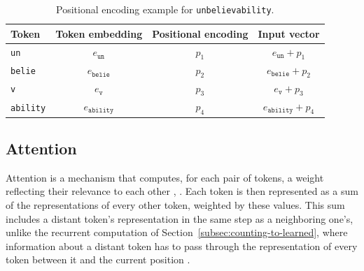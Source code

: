 \begin{table}[H]
  \centering
  \renewcommand{\arraystretch}{1.2}
  \begin{tabular}{@{}lccc@{}}
    \toprule
    Token & Token embedding & Positional encoding & Input vector \\
    \midrule
    \texttt{un}      & $e_{\mathtt{un}}$      & $p_1$ & $e_{\mathtt{un}} + p_1$ \\
    \texttt{belie}   & $e_{\mathtt{belie}}$   & $p_2$ & $e_{\mathtt{belie}} + p_2$ \\
    \texttt{v}       & $e_{\mathtt{v}}$       & $p_3$ & $e_{\mathtt{v}} + p_3$ \\
    \texttt{ability} & $e_{\mathtt{ability}}$ & $p_4$ & $e_{\mathtt{ability}} + p_4$ \\
    \bottomrule
  \end{tabular}
  \caption[Positional encoding example for \texttt{unbelievability}]{Positional encoding example for \texttt{unbelievability}.}
  \label{tab:positional-encoding-example}
\end{table}

\subsection{Attention}
\label{subsec:attention}

Attention is a mechanism that computes, for each pair of tokens, a weight reflecting their relevance to each other \cite{vaswaniAttentionAllYou2023}, \cite[Chap.~25]{russellArtificialIntelligenceModern2022}. Each token is then represented as a sum of the representations of every other token, weighted by these values. This sum includes a distant token's representation in the same step as a neighboring one's, unlike the recurrent computation of Section~\ref{subsec:counting-to-learned}, where information about a distant token has to pass through the representation of every token between it and the current position \cite{vaswaniAttentionAllYou2023}.

